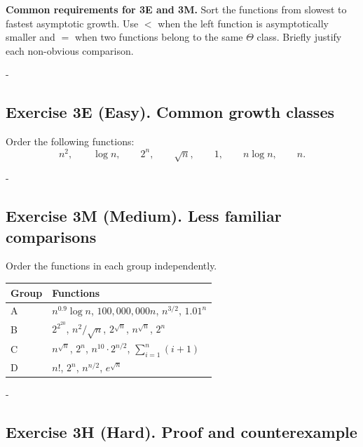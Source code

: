 \documentclass[11pt,a4paper]{article}
\makeatletter
\newcommand{\Needspace}[1]{\par\penalty-100\begingroup\setlength{\dimen@}{#1}\dimen@ii\pagegoal\advance\dimen@ii-\pagetotal\ifdim\dimen@>\dimen@ii\break\fi\endgroup}
\makeatother
\begin{document}
\begin{problembox}
\textbf{Common requirements for 3E and 3M.}
Sort the functions from slowest to fastest asymptotic growth. Use $<$ when the
left function is asymptotically smaller and $=$ when two functions belong to
the same $\Theta$ class. Briefly justify each non-obvious comparison.
\end{problembox}

\Needspace{0.18\textheight}
\subsection*{Exercise 3E (Easy). Common growth classes}

\begin{problembox}
Order the following functions:
\[
    n^2,\qquad \log n,\qquad 2^n,\qquad \sqrt n,\qquad
    1,\qquad n\log n,\qquad n.
\]
\end{problembox}

\Needspace{0.26\textheight}
\subsection*{Exercise 3M (Medium). Less familiar comparisons}

\begin{problembox}
Order the functions in each group independently.

\medskip
\begin{center}
\renewcommand{\arraystretch}{1.3}
\begin{tabular}{L{0.12\textwidth}L{0.78\textwidth}}
\toprule
\textbf{Group} & \textbf{Functions} \\
\midrule
A & $n^{0.9}\log n$, $100{,}000{,}000n$, $n^{3/2}$,
    $1.01^n$ \\
B & $2^{2^{20}}$, $n^2/\sqrt n$, $2^{\sqrt n}$,
    $n^{\sqrt n}$, $2^n$ \\
\addlinespace
C & $n^{\sqrt n}$, $2^n$, $n^{10}\cdot 2^{n/2}$,
    $\displaystyle\sum_{i=1}^{n}(i+1)$ \\
\addlinespace
D & $n!$, $2^n$, $n^{n/2}$, $e^{\sqrt n}$ \\
\bottomrule
\end{tabular}
\end{center}

\end{problembox}

\Needspace{0.31\textheight}
\subsection*{Exercise 3H (Hard). Proof and counterexample}
\end{document}
